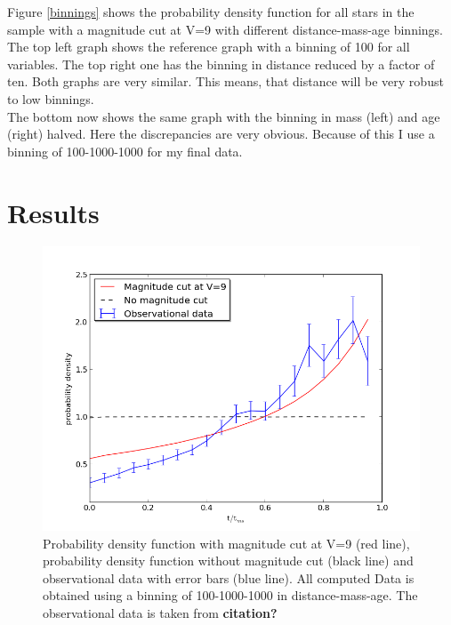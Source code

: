 \documentclass[a4paper,10pt]{article}
\begin{document}
  Figure \ref{binnings} shows the probability density function for all stars in the sample
  with a magnitude cut at V=9 with different distance-mass-age binnings. The top left graph shows the reference graph
  with a binning of 100 for all variables. The top right one has the binning in distance reduced by a factor of ten. Both graphs
  are very similar. This means, that distance will be very robust to low binnings. \\
  The bottom now shows the same graph with the binning in mass (left) and age (right) halved. Here the discrepancies are very obvious. 
  Because of this I use a binning of 100-1000-1000 for my final data.
 
 \newpage
 \section{Results}
 \begin{figure}[h!]
   \includegraphics[width=\textwidth]{plot1}
   \caption{Probability density function with magnitude cut at V=9 (red line), probability density function without magnitude cut
   (black line) and observational data with error bars (blue line). All computed Data is obtained using a binning of 100-1000-1000
   in distance-mass-age. The observational data is taken from \textbf{citation?}\label{all3}}
 \end{figure}
 
\end{document}
